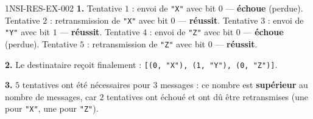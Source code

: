 \begin{corrige}{1NSI-RES-EX-002}
\textbf{1.} Tentative $1$ : envoi de \lstinline{"X"} avec bit $0$ — \textbf{échoue}
(perdue). Tentative $2$ : retransmission de \lstinline{"X"} avec bit $0$ — \textbf{réussit}.
Tentative $3$ : envoi de \lstinline{"Y"} avec bit $1$ — \textbf{réussit}. Tentative $4$ :
envoi de \lstinline{"Z"} avec bit $0$ — \textbf{échoue} (perdue). Tentative $5$ :
retransmission de \lstinline{"Z"} avec bit $0$ — \textbf{réussit}.

\textbf{2.} Le destinataire reçoit finalement : \lstinline{[(0, "X"), (1, "Y"), (0, "Z")]}.

\textbf{3.} $5$ tentatives ont été nécessaires pour $3$ messages : ce nombre est
\textbf{supérieur} au nombre de messages, car $2$ tentatives ont échoué et ont dû être
retransmises (une pour \lstinline{"X"}, une pour \lstinline{"Z"}).
\end{corrige}
